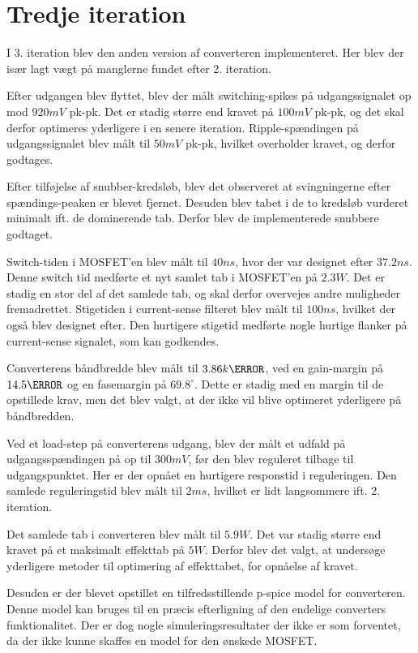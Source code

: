 
\section{Tredje iteration}
I 3. iteration blev den anden version af converteren implementeret. Her blev der især lagt vægt på manglerne fundet efter 2. iteration. 

Efter udgangen blev flyttet, blev der målt switching-spikes på udgangssignalet op mod $920mV$ pk-pk. Det er stadig større end kravet på $100mV$ pk-pk, og det skal derfor optimeres yderligere i en senere iteration. Ripple-spændingen på udgangssignalet blev målt til $50mV$ pk-pk, hvilket overholder kravet, og derfor godtages.

Efter tilføjelse af snubber-kredsløb, blev det observeret at svingningerne efter spændings-peaken er blevet fjernet. Desuden blev tabet i de to kredsløb vurderet minimalt ift. de dominerende tab. Derfor blev de implementerede snubbere godtaget.

Switch-tiden i MOSFET'en blev målt til $40ns$, hvor der var designet efter $37.2ns$. Denne switch tid medførte et nyt samlet tab i MOSFET'en på $2.3W$. Det er stadig en stor del af det samlede tab, og skal derfor overvejes andre muligheder fremadrettet. Stigetiden i current-sense filteret blev målt til $100ns$, hvilket der også blev designet efter. Den hurtigere stigetid medførte nogle hurtige flanker på current-sense signalet, som kan godkendes.

Converterens båndbredde blev målt til $3.86k\hertz$, ved en gain-margin på $14.5\decibel$ og en fasemargin på $69.8^\circ$. Dette er stadig med en margin til de opstillede krav, men det blev valgt, at der ikke vil blive optimeret yderligere på båndbredden. 

Ved et load-step på converterens udgang, blev der målt et udfald på udgangsspændingen på op til $300mV$, før den blev reguleret tilbage til udgangspunktet. Her er der opnået en hurtigere responstid i reguleringen. Den samlede reguleringstid blev målt til $2ms$, hvilket er lidt langsommere ift. 2. iteration. 

Det samlede tab i converteren blev målt til $5.9W$. Det var stadig større end kravet på et maksimalt effekttab på $5W$. Derfor blev det valgt, at undersøge yderligere metoder til optimering af effekttabet, for opnåelse af kravet. 

Desuden er der blevet opstillet en tilfredsstillende p-spice model for converteren. Denne model kan bruges til en præcis efterligning af den endelige converters funktionalitet. Der er dog nogle simuleringsresultater der ikke er som forventet, da der ikke kunne skaffes en model for den ønskede MOSFET. 


